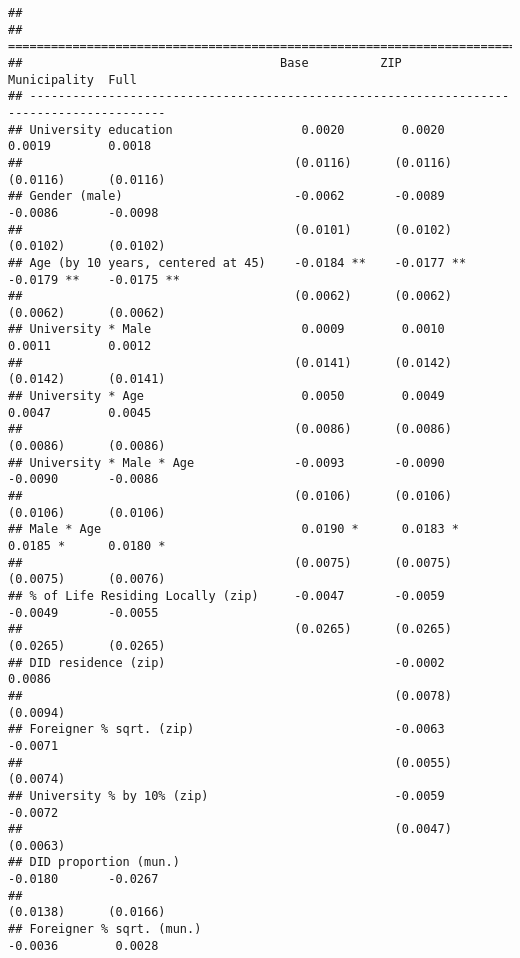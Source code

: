 \documentclass[
]{article}
\begin{document}
\begin{verbatim}
## 
## =========================================================================================
##                                    Base          ZIP           Municipality  Full        
## -----------------------------------------------------------------------------------------
## University education                  0.0020        0.0020        0.0019        0.0018   
##                                      (0.0116)      (0.0116)      (0.0116)      (0.0116)  
## Gender (male)                        -0.0062       -0.0089       -0.0086       -0.0098   
##                                      (0.0101)      (0.0102)      (0.0102)      (0.0102)  
## Age (by 10 years, centered at 45)    -0.0184 **    -0.0177 **    -0.0179 **    -0.0175 **
##                                      (0.0062)      (0.0062)      (0.0062)      (0.0062)  
## University * Male                     0.0009        0.0010        0.0011        0.0012   
##                                      (0.0141)      (0.0142)      (0.0142)      (0.0141)  
## University * Age                      0.0050        0.0049        0.0047        0.0045   
##                                      (0.0086)      (0.0086)      (0.0086)      (0.0086)  
## University * Male * Age              -0.0093       -0.0090       -0.0090       -0.0086   
##                                      (0.0106)      (0.0106)      (0.0106)      (0.0106)  
## Male * Age                            0.0190 *      0.0183 *      0.0185 *      0.0180 * 
##                                      (0.0075)      (0.0075)      (0.0075)      (0.0076)  
## % of Life Residing Locally (zip)     -0.0047       -0.0059       -0.0049       -0.0055   
##                                      (0.0265)      (0.0265)      (0.0265)      (0.0265)  
## DID residence (zip)                                -0.0002                      0.0086   
##                                                    (0.0078)                    (0.0094)  
## Foreigner % sqrt. (zip)                            -0.0063                     -0.0071   
##                                                    (0.0055)                    (0.0074)  
## University % by 10% (zip)                          -0.0059                     -0.0072   
##                                                    (0.0047)                    (0.0063)  
## DID proportion (mun.)                                            -0.0180       -0.0267   
##                                                                  (0.0138)      (0.0166)  
## Foreigner % sqrt. (mun.)                                         -0.0036        0.0028   

\end{verbatim}
\end{document}
